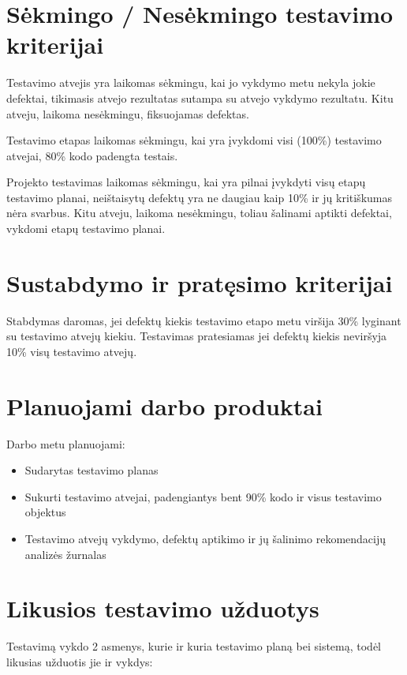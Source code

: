\section{Sėkmingo / Nesėkmingo testavimo kriterijai}

Testavimo atvejis yra laikomas sėkmingu, kai jo vykdymo metu nekyla jokie defektai, tikimasis atvejo rezultatas sutampa su atvejo vykdymo rezultatu. 
Kitu atveju, laikoma nesėkmingu, fiksuojamas defektas.

Testavimo etapas laikomas sėkmingu, kai yra įvykdomi visi (100\%) testavimo atvejai, 80\% kodo padengta testais. 

Projekto testavimas laikomas sėkmingu, kai yra pilnai įvykdyti visų etapų testavimo planai, neištaisytų defektų yra ne daugiau kaip 10\% ir jų kritiškumas nėra svarbus. 
Kitu atveju, laikoma nesėkmingu, toliau šalinami aptikti defektai, vykdomi etapų testavimo planai.

\section{Sustabdymo ir pratęsimo kriterijai}

Stabdymas daromas, jei defektų kiekis testavimo etapo metu viršija 30\% lyginant su testavimo atvejų kiekiu. 
Testavimas pratesiamas jei defektų kiekis neviršyja 10\% visų testavimo atvejų.

\section{Planuojami darbo produktai}

Darbo metu planuojami: 

\begin{itemize}
	\item Sudarytas testavimo planas
	\item Sukurti testavimo atvejai, padengiantys bent 90\% kodo ir visus testavimo objektus
	\item Testavimo atvejų vykdymo, defektų aptikimo ir jų šalinimo rekomendacijų analizės žurnalas
\end{itemize}

\section{Likusios testavimo užduotys}

Testavimą vykdo 2 asmenys, kurie ir kuria testavimo planą bei sistemą, todėl likusias užduotis jie ir vykdys:


